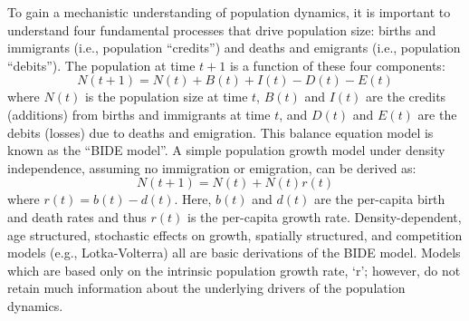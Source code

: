To gain a mechanistic understanding of population dynamics, it is 
important to understand four fundamental processes that drive 
population size: births and immigrants (i.e., population ``credits'') and deaths and
emigrants (i.e., population ``debits'').  The population at time $t+1$ is a
function of these four components:
\[
N(t+1) = N(t) + B(t) + I(t) - D(t) - E(t)
\]
where $N(t)$ is the population size at time $t$, $B(t)$ and $I(t)$ are the credits (additions) from births and
immigrants at time $t$, and $D(t)$ and $E(t)$ are the debits (losses) due to deaths and emigration.   This balance
equation model is 
known as
the ``BIDE model''.  A simple population growth model under density independence, assuming no immigration or emigration,
can be derived as:
\[
N(t+1) = N(t) + N(t)r(t)
\]
where $r(t) = b(t) - d(t)$.  Here, $b(t)$ and $d(t)$ are the per-capita birth and death rates and thus $r(t)$ is the per-capita
growth rate. Density-dependent, age structured, stochastic effects on
growth, spatially structured, and competition models (e.g., Lotka-Volterra)
all are basic derivations of the BIDE model.  Models which are based only on the intrinsic population growth rate, `r'; 
however, do not retain much information 
about the underlying drivers of the population dynamics. 

